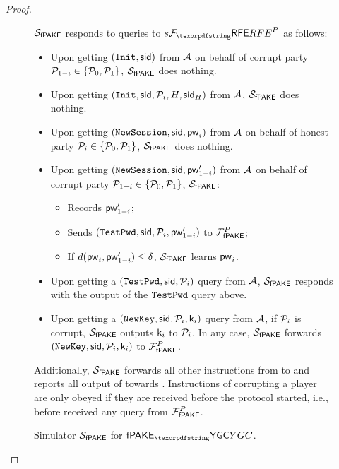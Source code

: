 \begin{proof}
\begin{figure}[htbp]
  \centering
  \begin{fboxenv}
    \begin{minipage}{0.95\textwidth}
    $\mathcal{S}_{\textsf{fPAKE}}$ responds to queries to $\Fsrfe^{P}$ as follows:
	\begin{itemize}
	\item Upon getting $(\texttt{Init}, \mathsf{sid})$ from $\mathcal{A}$ on behalf of corrupt party $\mathcal{P}_{1-i} \in \{\mathcal{P}_{0}, \mathcal{P}_{1}\}$, $\mathcal{S}_{\textsf{fPAKE}}$ 
	does nothing.
	\item Upon getting $(\texttt{Init}, \mathsf{sid}, \mathcal{P}_{i}, H, \mathsf{sid}_{H})$ from $\mathcal{A}$, $\mathcal{S}_{\textsf{fPAKE}}$ 
	does nothing.
	\item Upon getting $(\texttt{NewSession}, \mathsf{sid}, \mathsf{pw}_{i})$ from $\mathcal{A}$ on behalf of honest party $\mathcal{P}_{i} \in \{\mathcal{P}_{0}, \mathcal{P}_{1}\}$, $\mathcal{S}_{\textsf{fPAKE}}$ does nothing.
	\item Upon getting $(\texttt{NewSession}, \mathsf{sid}, \mathsf{pw}_{1-i}')$ from $\mathcal{A}$ on behalf of corrupt party $\mathcal{P}_{1-i} \in \{\mathcal{P}_{0}, \mathcal{P}_{1}\}$, $\mathcal{S}_{\textsf{fPAKE}}$:
	\begin{itemize}
	\item Records $\mathsf{pw}_{1-i}'$;
	\item Sends $(\texttt{TestPwd}, \mathsf{sid}, \mathcal{P}_{i}, \mathsf{pw}_{1-i}')$ to $\mathcal{F}_\textsf{fPAKE}^{P}$;
	\item If $d(\mathsf{pw}_{i}, \mathsf{pw}_{1-i}') \leq \delta$, $\mathcal{S}_{\textsf{fPAKE}}$ learns $\mathsf{pw}_{i}$.
	\end{itemize}
	\item Upon getting a $(\texttt{TestPwd}, \mathsf{sid}, \mathcal{P}_{i})$ query from $\mathcal{A}$, 
	$\mathcal{S}_{\textsf{fPAKE}}$ responds with the output of the $\texttt{TestPwd}$ query above.
	\item Upon getting a $(\texttt{NewKey}, \mathsf{sid}, \mathcal{P}_{i}, \mathsf{k}_{i})$ query from $\mathcal{A}$, 
	if $\mathcal{P}_{i}$ is corrupt, $\mathcal{S}_{\textsf{fPAKE}}$ outputs $\mathsf{k}_{i}$ to $\mathcal{P}_{i}$.
	In any case, $\mathcal{S}_{\textsf{fPAKE}}$ forwards $(\texttt{NewKey}, \mathsf{sid}, \mathcal{P}_{i}, \mathsf{k}_{i})$ to $\mathcal{F}_\textsf{fPAKE}^{P}$.
	\end{itemize}
	Additionally, $\mathcal{S}_{\textsf{fPAKE}}$ forwards all other instructions from \Env to \AdvA and reports all output of \AdvA towards \Env. Instructions of corrupting a player are only obeyed if they are received before the protocol started, i.e., before \Sim received any \NewKey query from $\mathcal{F}_\textsf{fPAKE}^{P}$.
    \end{minipage}
  \end{fboxenv}
  \caption{Simulator $\mathcal{S}_{\textsf{fPAKE}}$ for $\PfakeYGC$.}
  \label{fig:SimulatorYGCFAKE}
\end{figure}


\end{proof}
